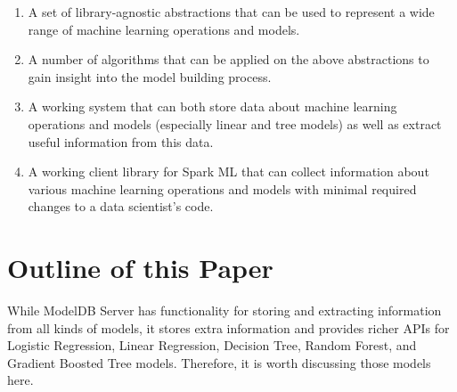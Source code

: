 \begin{enumerate}
  \item A set of library-agnostic abstractions that can be used to
    represent a wide range of machine learning operations and models.
  \item A number of algorithms that can be applied on the above abstractions
    to gain insight into the model building process.
  \item A working system that can both store data about 
    machine learning operations and models (especially linear and tree models) 
    as well as extract useful information from this data.
  \item A working client library for Spark ML that can collect information 
    about various  machine learning operations and models with 
    minimal required changes to a data scientist's code.
\end{enumerate}


\section{Outline of this Paper}

While ModelDB Server has functionality for storing and extracting information from
all kinds of models, it stores extra information and provides richer APIs for 
Logistic Regression, Linear Regression, Decision Tree, Random Forest, and 
Gradient Boosted Tree models. Therefore, it is worth discussing those models
here.

